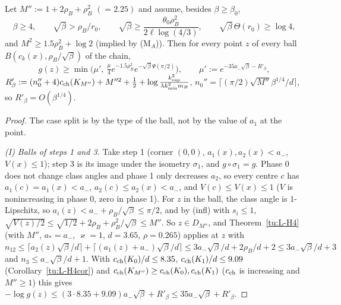 \begin{lemma}\label{tu:L-balls}
Let $M'':=1+2\rho_B+\rho_B^2$ $(=2.25)$ and assume, besides $\beta\ge\beta_0$,
\[
\beta\ge4,\qquad \sqrt\beta>\rho_B/r_0,\qquad \sqrt\beta\ge\frac{\theta_0\rho_B^2}{2\ell\log(4/3)},\qquad\sqrt\beta\,\Theta(r_0)\ge\log4 ,
\]
and $M^2\ge1.5\rho_B^2+\log2$ (implied by (M$_A$)). Then for every point $z$ of every ball $B(c_k(x),\rho_B/\sqrt\beta)$ of the chain,
\[
g(z)\ge\min\big(\mu',\ \tfrac\mu4e^{-1.5\rho_B^2}e^{-\sqrt\beta\Psi(\pi/2)}\big),\qquad
\mu':=e^{-35a_-\sqrt\beta-R'_\beta},
\]
$R'_\beta:=(n_0''+4)c_{\rm ch}(K_{M''})+M''^2+\tfrac12+\log\frac{k_{\sup}^2}{\lambda k_{\min}^2m_B}$, $n_0''=\lceil(\pi/2)\sqrt{M''}\beta^{1/4}/d\rceil$,
so $R'_\beta=O(\beta^{1/4})$.
\end{lemma}

\begin{proof}
The case split is by the type of the ball, not by the value of $a_1$ at the point.

\emph{(I) Balls of steps 1 and 3.} Take step 1 (corner $(0,0)$, $a_1(x),a_2(x)<a_-$, $V(x)\le1$); step 3 is its image under the
isometry $\sigma_1$, and $g\circ\sigma_1=g$. Phase 0 does not change class angles and phase 1 only decreases $a_2$, so every centre $c$
has $a_1(c)=a_1(x)<a_-$, $a_2(c)\le a_2(x)<a_-$, and $V(c)\le V(x)\le1$ ($V$ is nonincreasing in phase 0, zero in phase 1).
For $z$ in the ball, the class angle is $1$-Lipschitz, so $a_i(z)<a_-+\rho_B/\sqrt\beta\le\pi/2$, and by (infl) with $s_i\le1$,
$\sqrt{V(z)/2}\le\sqrt{1/2}+2\rho_B+\rho_B^2/\sqrt\beta\le M''$. So $z\in D_{M''}$, and Theorem~\ref{tu:L-H4} (with $M''$, $a_*=a_-$,
$\varkappa=1$, $d=3.65$, $\rho=0.265$) applies at $z$ with
$n_{12}\le\lceil a_2(z)\sqrt\beta/d\rceil+\lceil(a_1(z)+a_-)\sqrt\beta/d\rceil\le3a_-\sqrt\beta/d+2\rho_B/d+2\le3a_-\sqrt\beta/d+3$ and
$n_3\le a_-\sqrt\beta/d+1$. With $c_{\rm ch}(K_0)/d\le8.35$, $c_{\rm ch}(K_1)/d\le9.09$ (Corollary~\ref{tu:L-H4cor}) and
$c_{\rm ch}(K_{M''})\ge c_{\rm ch}(K_0),c_{\rm ch}(K_1)$ ($c_{\rm ch}$ is increasing and $M''\ge1$) this gives
$-\log g(z)\le(3\cdot8.35+9.09)a_-\sqrt\beta+R'_\beta\le35a_-\sqrt\beta+R'_\beta$.


\end{proof}
